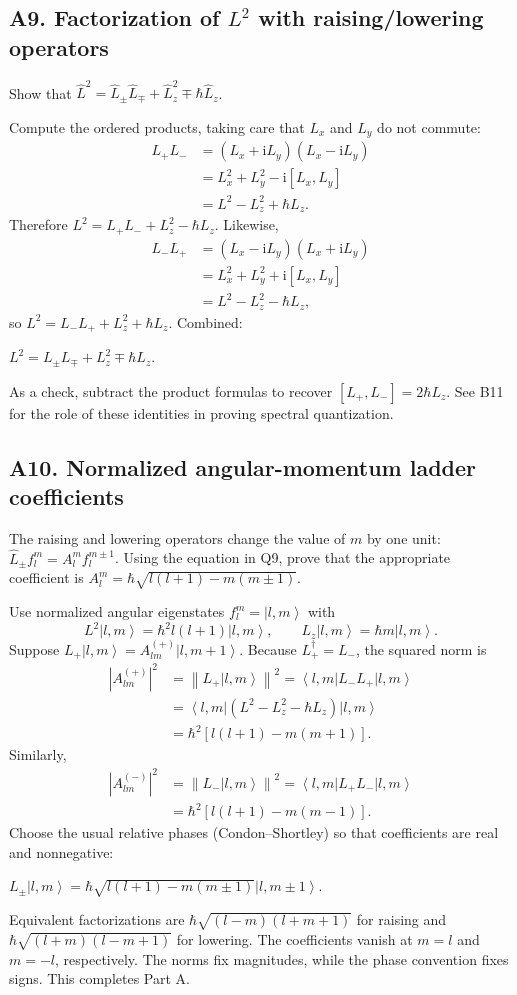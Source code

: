 \documentclass[11pt,a4paper]{article}
\newcommand{\key}[1]{\begin{resultbox}\centering\(\displaystyle #1\)\end{resultbox}}
\newcommand{\iu}{\mathrm{i}}
\newcommand{\ket}[1]{\left|#1\right\rangle}
\newcommand{\bra}[1]{\left\langle #1\right|}
\newcommand{\norm}[1]{\left\lVert #1\right\rVert}
\begin{document}
\subsection{A9. Factorization of \texorpdfstring{$L^2$}{L2} with raising/lowering operators}
\begin{questionbox}Show that \(\hat L^2=\hat L_\pm\hat L_\mp+\hat L_z^2\mp\hbar\hat L_z\).\end{questionbox}
Compute the ordered products, taking care that \(L_x\) and \(L_y\) do not commute:
\begin{align}
L_+L_-&=(L_x+\iu L_y)(L_x-\iu L_y)\\
&=L_x^2+L_y^2-\iu[L_x,L_y]\\
&=L^2-L_z^2+\hbar L_z.
\end{align}
Therefore \(\boxed{L^2=L_+L_-+L_z^2-\hbar L_z}\). Likewise,
\begin{align}
L_-L_+&=(L_x-\iu L_y)(L_x+\iu L_y)\\
&=L_x^2+L_y^2+\iu[L_x,L_y]\\
&=L^2-L_z^2-\hbar L_z,
\end{align}
so \(\boxed{L^2=L_-L_++L_z^2+\hbar L_z}\). Combined:
\key{\boxed{L^2=L_\pm L_\mp+L_z^2\mp\hbar L_z.}}
As a check, subtract the product formulas to recover \([L_+,L_-]=2\hbar L_z\). See B11 for the role of these identities in proving spectral quantization.

\subsection{A10. Normalized angular-momentum ladder coefficients}
\begin{questionbox}The raising and lowering operators change the value of \(m\) by one unit: \(\hat L_\pm f_l^m=A_l^m f_l^{m\pm1}\). Using the equation in Q9, prove that the appropriate coefficient is \(A_l^m=\hbar\sqrt{l(l+1)-m(m\pm1)}\).\end{questionbox}
Use normalized angular eigenstates \(f_l^m=\ket{l,m}\) with
\begin{equation}L^2\ket{l,m}=\hbar^2l(l+1)\ket{l,m},\qquad L_z\ket{l,m}=\hbar m\ket{l,m}.\end{equation}
Suppose \(L_+\ket{l,m}=A_{lm}^{(+)}\ket{l,m+1}\). Because \(L_+^\dagger=L_-\), the squared norm is
\begin{align}
|A_{lm}^{(+)}|^2&=\norm{L_+\ket{l,m}}^2=\bra{l,m}L_-L_+\ket{l,m}\\
&=\bra{l,m}(L^2-L_z^2-\hbar L_z)\ket{l,m}\\
&=\hbar^2[l(l+1)-m(m+1)].
\end{align}
Similarly,
\begin{align}
|A_{lm}^{(-)}|^2&=\norm{L_-\ket{l,m}}^2=\bra{l,m}L_+L_-\ket{l,m}\\
&=\hbar^2[l(l+1)-m(m-1)].
\end{align}
Choose the usual relative phases (Condon--Shortley) so that coefficients are real and nonnegative:
\key{\boxed{L_\pm\ket{l,m}=\hbar\sqrt{l(l+1)-m(m\pm1)}\ket{l,m\pm1}.}}
Equivalent factorizations are \(\hbar\sqrt{(l-m)(l+m+1)}\) for raising and \(\hbar\sqrt{(l+m)(l-m+1)}\) for lowering. The coefficients vanish at \(m=l\) and \(m=-l\), respectively. The norms fix magnitudes, while the phase convention fixes signs. This completes Part A.
\end{document}
